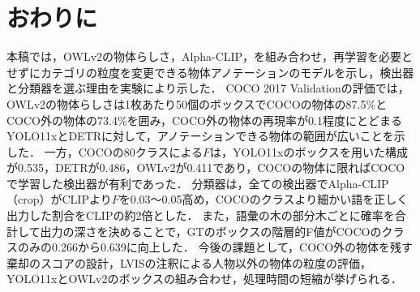 \section{おわりに}
本稿では，OWLv2の物体らしさ，Alpha-CLIP，を組み合わせ，再学習を必要とせずにカテゴリの粒度を変更できる物体アノテーションのモデルを示し，検出器と分類器を選ぶ理由を実験により示した．
COCO 2017 Validationの評価では，OWLv2の物体らしさは1枚あたり50個のボックスでCOCOの物体の87.5\%とCOCO外の物体の73.4\%を囲み，COCO外の物体の再現率が0.1程度にとどまるYOLO11xとDETRに対して，アノテーションできる物体の範囲が広いことを示した．
一方，COCOの80クラスによる$ F $は，YOLO11xのボックスを用いた構成が0.535，DETRが0.486，OWLv2が0.411であり，COCOの物体に限ればCOCOで学習した検出器が有利であった．
分類器は，全ての検出器でAlpha-CLIP（crop）がCLIPより$ F $を0.03〜0.05高め，COCOのクラスより細かい語を正しく出力した割合をCLIPの約2倍とした．
また，語彙の木の部分木ごとに確率を合計して出力の深さを決めることで，GTのボックスの階層的F値がCOCOのクラスのみの0.266から0.639に向上した．
今後の課題として，COCO外の物体を残す棄却のスコアの設計，LVISの注釈による人物以外の物体の粒度の評価，YOLO11xとOWLv2のボックスの組み合わせ，処理時間の短縮が挙げられる．
